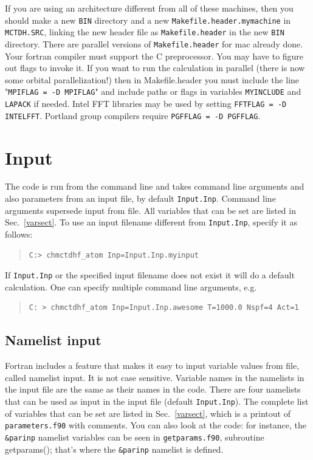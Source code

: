 \documentclass[10pt,leqno, oneside]{book}
\begin{document}
If you are using an architecture different from all of these machines, then you should make a new \verb#BIN# directory and a new \verb#Makefile.header.mymachine#
in \verb#MCTDH.SRC#, linking the new header file as \verb#Makefile.header# in the new \verb#BIN# directory.
There are parallel versions of \verb#Makefile.header# for mac already done.
Your fortran compiler must support the C preprocessor.  You may have to figure out flags to invoke it.
If you want to run the calculation in parallel (there is now some orbital parallelization!)
then in Makefile.header 
you must include the line "\verb#MPIFLAG = -D MPIFLAG#"  and include
paths or flags in 
variables \verb#MYINCLUDE# and \verb#LAPACK# if needed.  Intel FFT libraries may be used by setting \verb#FFTFLAG = -D INTELFFT#.
Portland group compilers require \verb#PGFFLAG = -D PGFFLAG#.



\chapter{Input}

 The code is run from the command line and takes command line arguments and also parameters from an input file, by default \verb#Input.Inp#.  
 Command line arguments supersede input from file.
 All variables that can be set are listed in Sec.~\ref{varsect}.
To use an input filename different from \verb#Input.Inp#, specify it as follows:
\begin{quote}
{\small\begin{verbatim}
C:> chmctdhf_atom Inp=Input.Inp.myinput
\end{verbatim}}
\end{quote}
%
If \verb#Input.Inp# or the specified input filename does not exist it will do a default calculation.  One can specify multiple command 
line arguments, e.g.
\begin{quote}
{\small 
\begin{verbatim}
C: > chmctdhf_atom Inp=Input.Inp.awesome T=1000.0 Nspf=4 Act=1
\end{verbatim}}
\end{quote}



\section{Namelist input}

Fortran includes a feature that makes it easy to input variable values from file, called namelist input.  It is not case sensitive.  
Variable names in the namelists in the input file are the same as their names in the code.  There are four 
namelists that can be used as input in the input file (default \verb#Input.Inp#).   The complete list of variables that can be set are listed in Sec.~\ref{varsect},
which is a printout of \verb#parameters.f90# with comments.  You can also look at the code: for instance,
the \verb#&parinp# namelist variables can be seen in \verb#getparams.f90#, subroutine getparams(); that's where the \verb#&parinp# namelist is defined.
\end{document}

